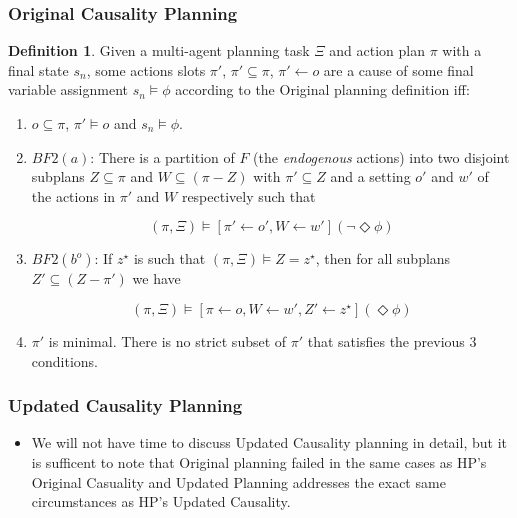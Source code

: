 \documentclass{beamer}
\theoremstyle{plain}
\theoremstyle{definition}
\newtheorem{defn}[thm]{Definition} %
\begin{document}
\begin{frame}
\frametitle{Original Causality Planning}
\small
\begin{defn}
Given a multi-agent planning task $\Xi$ and action plan $\pi$ with a final state $s_n$, some actions slots $\pi'$, $\pi' \subseteq \pi$, $\pi' \leftarrow o$ are a cause of some final variable assignment $s_n \models \phi$ according to the Original planning definition iff:
\begin{enumerate}
\item  $o \subseteq \pi$, $\pi' \models o$ and $s_n \models \phi$.



\item $BF2(a)$: There is a partition of $F$ (the \textit{endogenous} actions) into two disjoint subplans $Z \subseteq \pi$ and $W \subseteq (\pi - Z)$ with $\pi' \subseteq Z$ and a setting $o'$ and $w'$ of the actions in $\pi'$ and $W$ respectively such that

\[
(\pi, \Xi) \models [\pi' \leftarrow o', W \leftarrow w'](\lnot \Diamond \phi)
\]

\item $BF2(b^o)$: If $z^\star$ is such that $(\pi, \Xi) \models Z = z^\star$, then for all subplans $Z' \subseteq (Z - \pi')$ we have

\[
(\pi, \Xi) \models [\pi \leftarrow o, W \leftarrow w', Z' \leftarrow z^\star](\Diamond \phi)
\]

\item $\pi'$ is minimal. There is no strict subset of $\pi'$ that satisfies the previous 3 conditions.
\end{enumerate}
\end{defn}
\end{frame}


\begin{frame}
\frametitle{Updated Causality Planning}
\begin{itemize}
\item We will not have time to discuss Updated Causality planning in detail, but it is sufficent to note that Original planning failed in the same cases as HP's Original Casuality and Updated Planning addresses the exact same circumstances as HP's Updated Causality.
\end{itemize}
\end{frame}
\end{document}
